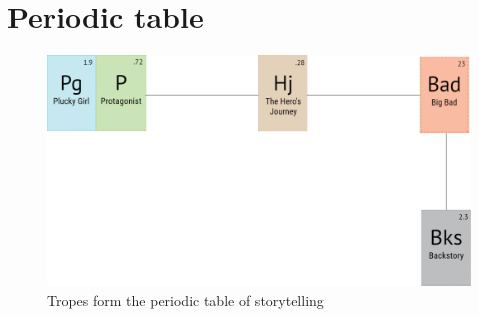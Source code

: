 \section{Periodic table}

\begin{figure}[H]
  \centering
  \includegraphics[width=14cm]{Images/SVG/Exported/periodicTable}
  \caption{Tropes form the periodic table of storytelling}
\end{figure}
